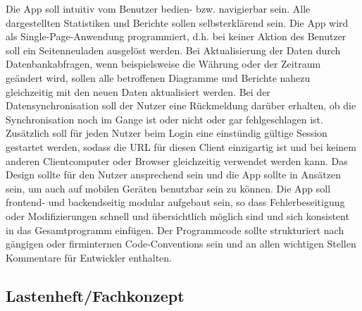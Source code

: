 Die App soll intuitiv vom Benutzer bedien- bzw. navigierbar sein. Alle dargestellten Statistiken und Berichte sollen selbsterklärend sein. Die App wird als Single-Page-Anwendung programmiert, d.h. bei keiner Aktion des Benutzer soll ein Seitenneuladen ausgelöst werden. Bei Aktualisierung der Daten durch Datenbankabfragen, wenn beispielsweise die Währung oder der Zeitraum geändert wird, sollen alle betroffenen Diagramme und Berichte nahezu gleichzeitig mit den neuen Daten aktualisiert werden. Bei der Datensynchronisation soll der Nutzer eine Rückmeldung darüber erhalten, ob die Synchronisation noch im Gange ist oder nicht oder gar fehlgeschlagen ist.
Zusätzlich soll für jeden Nutzer beim Login eine einstündig gültige Session gestartet werden, sodass die URL für diesen Client einzigartig ist und bei keinem anderen Clientcomputer oder Browser gleichzeitig verwendet werden kann. Das Design sollte für den Nutzer ansprechend sein und die App sollte in Ansätzen  sein, um auch auf mobilen Geräten benutzbar sein zu können.
Die App soll frontend- und backendseitig modular aufgebaut sein, so dass Fehlerbeseitigung oder Modifizierungen schnell und übersichtlich möglich sind und sich konsistent in das Gesamtprogramm einfügen.
Der Programmcode sollte strukturiert nach gängigen oder firminternen Code-Conventions sein und an allen wichtigen Stellen Kommentare für Entwickler enthalten.


\subsection{Lastenheft/Fachkonzept}
\label{sec:Lastenheft}

